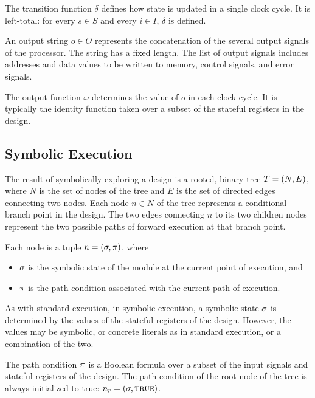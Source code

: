 The transition function $\delta$ defines how state is updated in a single clock
cycle. It is left-total: for every $s \in S$ and every $i \in I$, $\delta$ is defined.

An output string $o \in O$ represents the concatenation of the several output
signals of the processor. The string has a fixed length. The list of output
signals includes addresses and data values to be written to memory, control
signals, and error signals.

The output function $\omega$ determines the value of $o$ in each clock cycle. It
is typically the identity function taken over a subset of the stateful registers
in the design.

\subsection{Symbolic Execution}


The result of symbolically exploring a design is a rooted, binary tree $T = (N, E)$, where
$N$ is the set of nodes of the tree and $E$ is the set of directed edges connecting
two nodes. Each node $n \in N$ of the tree represents a conditional branch point in the
design. The two edges connecting $n$ to its two children nodes represent the two
possible paths of forward execution at that branch point.

Each node is a tuple $n = (\sigma, \pi)$, where
\begin{itemize}
\item $\sigma$ is the symbolic state of the module at the current point of
  execution, and
\item $\pi$ is the path condition associated with the current path of
  execution.
\end{itemize}


As with standard execution, in symbolic execution, a symbolic state $\sigma$
is determined by the values of the stateful registers of the design. However,
the values may be symbolic, or
concrete literals as in standard execution, or a combination of the two.

The path condition $\pi$ is a Boolean formula over a subset of the input signals and
stateful registers of the design. The path condition of the root node of the
tree is always initialized to true: $n_r = (\sigma, \mathtt{\textsc{true}})$.

